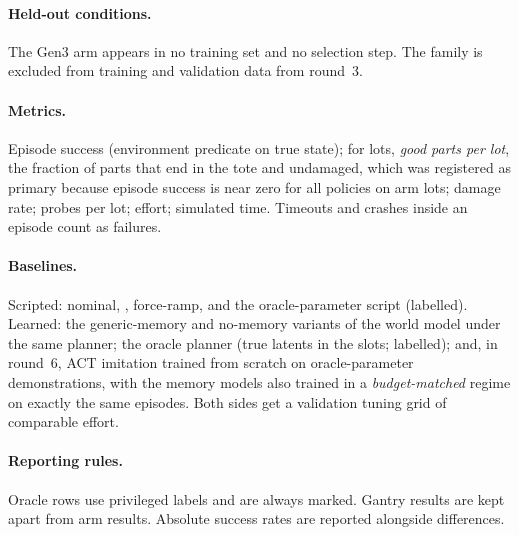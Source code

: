 \paragraph{Held-out conditions.} The Gen3 arm appears in no training set and no selection step. The
 family is excluded from training and validation data from round~3.

\paragraph{Metrics.} Episode success (environment predicate on true state); for lots, \emph{good parts per lot},
the fraction of parts that end in the tote and undamaged, which was registered as primary because episode
success is near zero for all policies on arm lots; damage rate; probes per lot; effort; simulated time.
Timeouts and crashes inside an episode count as failures.

\paragraph{Baselines.} Scripted: nominal, \pta{}, force-ramp, and the oracle-parameter script (labelled).
Learned: the generic-memory and no-memory variants of the world model under the same planner; the oracle planner
(true latents in the slots; labelled); and, in round~6, ACT imitation \citep{zhao2023act} trained from scratch
on oracle-parameter demonstrations, with the memory models also trained in a \emph{budget-matched} regime on
exactly the same episodes. Both sides get a validation tuning grid of comparable effort.

\paragraph{Reporting rules.} Oracle rows use privileged labels and are always marked. Gantry results are kept
apart from arm results. Absolute success rates are reported alongside differences.
